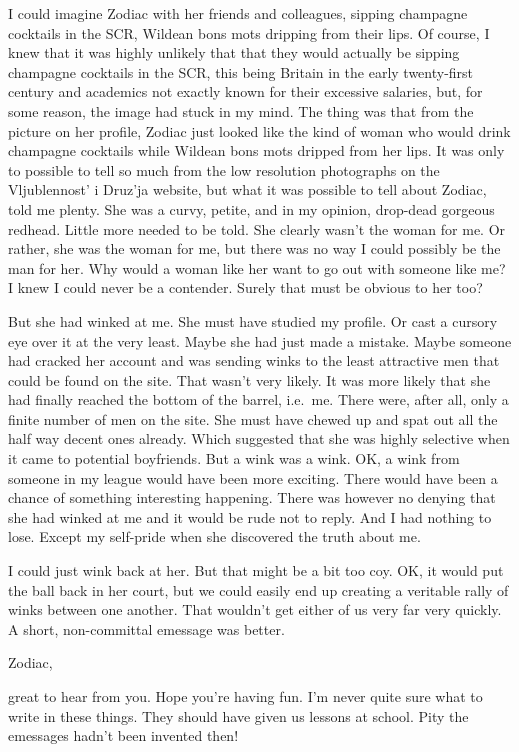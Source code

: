 I could imagine Zodiac with her friends and colleagues, sipping
champagne cocktails in the SCR, Wildean {\twelveit bons mots\/}
dripping from their lips. Of course, I knew that it was highly
unlikely that that they would actually be sipping champagne
cocktails in the SCR, this being Britain in the early twenty-first
century and academics not exactly known for their excessive
salaries, but, for some reason, the image had stuck in my mind. The
thing was that from the picture on her profile, Zodiac just looked
like the kind of woman who would drink champagne cocktails while
Wildean {\twelveit bons mots\/} dripped from her lips. It was only
to possible to tell so much from the low resolution photographs on
the Vljublennost' i Druz'ja website, but what it was possible to
tell about Zodiac, told me plenty. She was a curvy, petite, and in
my opinion, drop-dead gorgeous redhead. Little more needed to be
told. She clearly wasn't the woman for me. Or rather, she was the
woman for me, but there was no way I could possibly be the man for
her. Why would a woman like her want to go out with someone like me?
I knew I could never be a contender. Surely that must be obvious to
her too?

But she had winked at me. She must have studied my profile. Or cast
a cursory eye over it at the very least. Maybe she had just made a
mistake. Maybe someone had cracked her account and was sending winks
to the least attractive men that could be found on the site. That
wasn't very likely. It was more likely that she had finally reached
the bottom of the barrel, i.e.~me. There were, after all, only a
finite number of men on the site. She must have chewed up and spat
out all the half way decent ones already. Which suggested that she
was highly selective when it came to potential boyfriends. But a
wink was a wink. OK, a wink from someone in my league would have
been more exciting. There would have been a chance of something
interesting happening. There was however no denying that she had
winked at me and it would be rude not to reply. And I had nothing to
lose. Except my self-pride when she discovered the truth about me.

I could just wink back at her. But that might be a bit too coy. OK,
it would put the ball back in her court, but we could easily end up
creating a veritable rally of winks between one another. That
wouldn't get either of us very far very quickly. A short,
non-committal emessage was better.

\startmessage
Zodiac,

great to hear from you. Hope you're having fun. I'm never quite sure
what to write in these things. They should have given us lessons at
school. Pity the emessages hadn't been invented then!

